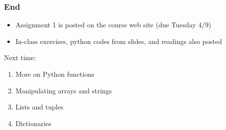 \documentclass{beamer}
\begin{document}
\begin{frame}
\frametitle{End}
\begin{itemize}
\setlength{\itemsep}{0.05in}
\item{Assignment 1 is posted on the course web site (due Tuesday 4/9)}
\item{In-class exercises, python codes from slides, and readings also posted}
\end{itemize}

Next time:
\begin{enumerate}
\setlength{\itemsep}{0.05in}
\item{More on Python functions}
\item{Manipulating arrays and strings}
\item{Lists and tuples}
\item{Dictionaries}
\end{enumerate}

\end{frame}
\end{document}
